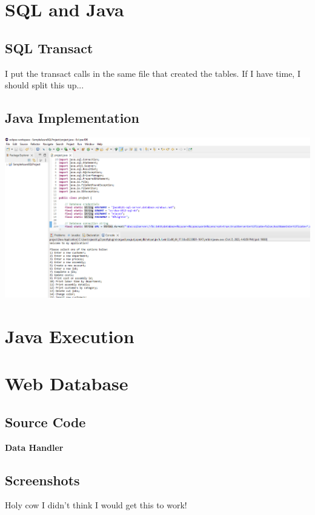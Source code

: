 \documentclass[11pt]{article}
\begin{document}
\section{SQL and Java}
\subsection{SQL Transact}
I put the transact calls in the same file that created the tables.  If I have time, I should split this up...

\subsection{Java Implementation}
\includegraphics[width = \textwidth]{JavaSuccess.png}
\section{Java Execution}
\section{Web Database}
\subsection{Source Code}
{\bf Data Handler}




\subsection{Screenshots}
Holy cow I didn't think I would get this to work!
\end{document}
